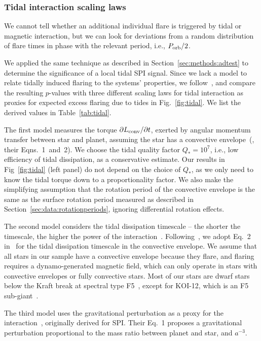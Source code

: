 \documentclass[twocolumn]{aastex631}
\begin{document}
\subsubsection{Tidal interaction scaling laws}

We cannot tell whether an additional individual flare is triggered by tidal or magnetic interaction, but we can look for deviations from a random distribution of flare times in phase with the relevant period, i.e., $P_{\rm orb}/2$. 

We applied the same technique as described in Section~\ref{sec:methods:adtest} to determine the significance of a local tidal SPI signal. Since we lack a model to relate tidally induced flaring to the systems' properties, we follow~\citet{ilic2022tidal}, and compare the resulting $p$-values with three different scaling laws for tidal interaction as proxies for expected excess flaring due to tides in Fig.~\ref{fig:tidal}. We list the derived values in Table~\ref{tab:tidal}. 

The first model measures the torque $\partial L_{\rm conv} / \partial t$, exerted by angular momentum transfer between star and planet, assuming the star has a convective envelope~(\citealt{penev2012constraining}, their Eqns.~1~and~2). We choose the tidal quality factor $Q_*=10^7$, i.e., low efficiency of tidal dissipation, as a conservative estimate. Our results in Fig~\ref{fig:tidal} (left panel) do not depend on the choice of $Q_*$, as we only need to know the tidal torque down to a proportionality factor. We also make the simplifying assumption that the rotation period of the convective envelope is the same as the surface rotation period measured as described in Section~\ref{sec:data:rotationperiods}, ignoring differential rotation effects.

The second model considers the tidal dissipation timescale -- the shorter the timescale, the higher the power of the interaction~\citep{zahn1977tidal}. Following~\citet{ilic2022tidal}, we adopt Eq.~2 in~\citet{albrecht2012obliquities} for the tidal dissipation timescale in the convective envelope. We assume that all stars in our sample have a convective envelope because they flare, and flaring requires a dynamo-generated magnetic field, which can only operate in stars with convective envelopes or fully convective stars. Most of our stars are dwarf stars below the Kraft break at spectral type F5~\citep{kraft1967studies}, except for KOI-12, which is an F5 sub-giant~\citep{frasca2016activity}.

The third model uses the gravitational perturbation as a proxy for the interaction~\citep{cuntz2000stellar}, originally derived for SPI. Their Eq.~1 proposes a gravitational perturbation proportional to the mass ratio between planet and star, and $a^{-3}$. 
\end{document}

